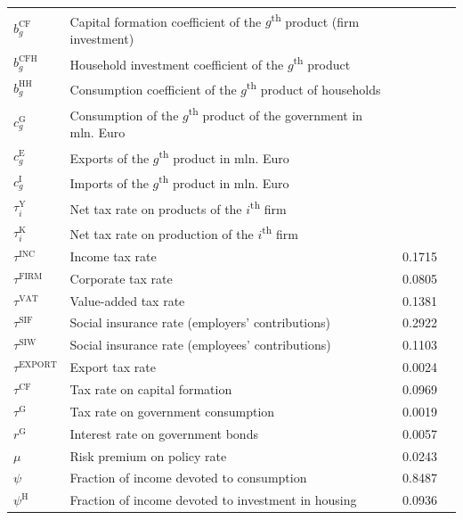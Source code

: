 \begin{table}[!htbp]
{\begin{tabular}{llrl}
			$b^{\mathrm{CF}}_g$ & Capital formation coefficient of the $g$\textsuperscript{th} product (firm investment) & & \\ 
			$b^{\mathrm{CFH}}_{g}$ & Household investment coefficient of the $g$\textsuperscript{th} product & & \\ 
			$b^{\mathrm{HH}}_{g}$ & Consumption coefficient of the $g$\textsuperscript{th} product of households & & \\ 
			$c^{\mathrm{G}}_g$ & Consumption of the $g$\textsuperscript{th} product of the government in mln. Euro & & \\ 
			$c^{\mathrm{E}}_g$ & Exports of the $g$\textsuperscript{th} product in mln. Euro & & \\ 
			$c^{\mathrm{I}}_g$ & Imports of the $g$\textsuperscript{th} product in mln. Euro & & \\ 
			$\tau^{\mathrm{Y}}_{i}$ & Net tax rate on products of the $i$\textsuperscript{th} firm & & \\ 
			$\tau^{\mathrm{K}}_{i}$ & Net tax rate on production of the $i$\textsuperscript{th} firm & & \\ 
			\midrule
			$\tau^{\mathrm{INC}}$ & Income tax rate & 0.1715 & \multirow{13}{*}{\rotatebox[origin=c]{90}{\parbox[c]{4cm}{\centering government statistics, sector accounts}}} \\ 
			$\tau^{\mathrm{FIRM}}$ & Corporate tax rate & 0.0805 & \\ 
			$\tau^{\mathrm{VAT}}$ & Value-added tax rate & 0.1381 & \\ 
			$\tau^{\mathrm{SIF}}$ & Social insurance rate (employers' contributions) & 0.2922 & \\ 
			$\tau^{\mathrm{SIW}}$ & Social insurance rate (employees' contributions) & 0.1103 & \\ 
			$\tau^{\mathrm{EXPORT}}$ & Export tax rate & 0.0024 & \\ 
			$\tau^{\mathrm{CF}}$ & Tax rate on capital formation & 0.0969 & \\ 
			$\tau^{\mathrm{G}}$ & Tax rate on government consumption & 0.0019 & \\ 
			$r^{\mathrm{G}}$ & Interest rate on government bonds & 0.0057 & \\ 
			$\mu$ & Risk premium on policy rate & 0.0243 & \\ 
			$\psi$ & Fraction of income devoted to consumption & 0.8487 & \\ 
			$\psi^{\mathrm{H}}$ & Fraction of income devoted to investment in housing & 0.0936 & \\ 

\end{tabular}}
\end{table}
